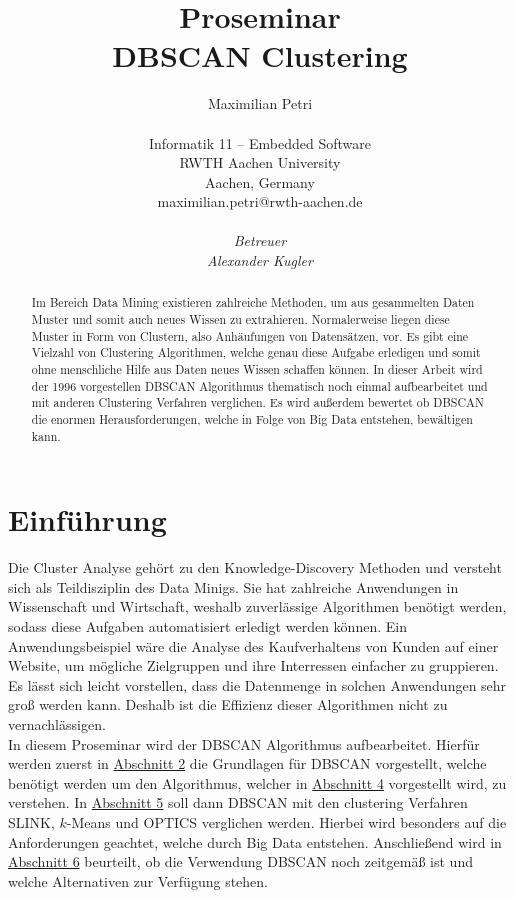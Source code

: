 \documentclass{lni}
\author{
	Maximilian Petri \\ 
	\\ 
	Informatik 11 -- Embedded Software \\ 
	RWTH Aachen University \\ 
	Aachen, Germany \\ 
	maximilian.petri@rwth-aachen.de\\
	\\
	\textit{Betreuer}\\
	\textit{Alexander Kugler}\\ 
}
\title{\small{Proseminar} \\ \vspace{0.5cm} \Large{DBSCAN Clustering}}
\begin{document}
\maketitle

%
%

\begin{abstract}
Im Bereich Data Mining existieren zahlreiche Methoden, um aus gesammelten Daten Muster und somit auch neues Wissen zu extrahieren. Normalerweise liegen diese Muster in Form von Clustern, also Anhäufungen von Datensätzen, vor. Es gibt eine Vielzahl von Clustering Algorithmen, welche genau diese Aufgabe erledigen und somit ohne menschliche Hilfe aus Daten neues Wissen schaffen können. In dieser Arbeit wird der 1996 vorgestellen DBSCAN Algorithmus thematisch noch einmal aufbearbeitet und mit anderen Clustering Verfahren verglichen. Es wird außerdem bewertet ob DBSCAN die enormen Herausforderungen, welche in Folge von Big Data entstehen, bewältigen kann.
\end{abstract}

%
%

\section{Einführung}
Die Cluster Analyse gehört zu den Knowledge-Discovery Methoden und versteht sich als Teildisziplin des Data Minigs. Sie hat zahlreiche Anwendungen in Wissenschaft und Wirtschaft, weshalb zuverlässige Algorithmen benötigt werden, sodass diese Aufgaben automatisiert erledigt werden können. Ein Anwendungsbeispiel wäre die Analyse des Kaufverhaltens von Kunden auf einer Website, um mögliche Zielgruppen und ihre Interressen einfacher zu gruppieren. Es lässt sich leicht vorstellen, dass die Datenmenge in solchen Anwendungen sehr groß werden kann. Deshalb ist die Effizienz dieser Algorithmen nicht zu vernachlässigen.\\
In diesem Proseminar wird der DBSCAN Algorithmus aufbearbeitet. Hierfür werden zuerst in \hyperref[sec:grund]{Abschnitt 2} die Grundlagen für DBSCAN vorgestellt, welche benötigt werden um den Algorithmus, welcher in \hyperref[sec:kern]{Abschnitt 4} vorgestellt wird, zu verstehen.
In \hyperref[sec:perf]{Abschnitt 5} soll dann DBSCAN mit den clustering Verfahren SLINK, $k$-Means und OPTICS verglichen werden. Hierbei wird besonders auf die Anforderungen geachtet, welche durch Big Data entstehen. Anschließend wird in \hyperref[sec:fazit]{Abschnitt 6} beurteilt, ob die Verwendung DBSCAN noch zeitgemäß ist und welche Alternativen zur Verfügung stehen.
\end{document}
